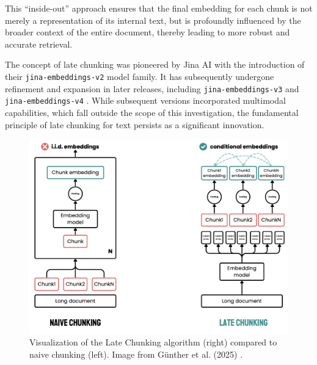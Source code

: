 This \enquote{inside-out} approach ensures that the final embedding for each chunk is not merely a representation of its internal text, but is profoundly influenced by the broader context of the entire document, thereby leading to more robust and accurate retrieval.

The concept of late chunking was pioneered by Jina AI with the introduction of their \texttt{jina-embeddings-v2} model family. It has subsequently undergone refinement and expansion in later releases, including \texttt{jina-embeddings-v3} \autocite{sturua2024jinaembeddingsv3multilingualembeddingstask} and \texttt{jina-embeddings-v4} \autocite{günther2025jinaembeddingsv4universalembeddingsmultimodal}. While subsequent versions incorporated multimodal capabilities, which fall outside the scope of this investigation, the fundamental principle of late chunking for text persists as a significant innovation.

\begin{figure}[!htbp]
    \centering
    \includegraphics[width=\textwidth]{images/chapter3/late_chunking.png}
    \caption{Visualization of the Late Chunking algorithm (right) compared to naive chunking (left). Image from Günther et al. (2025) \autocite{günther2025latechunkingcontextualchunk}.}
    \label{fig:late_chunking}
\end{figure}


